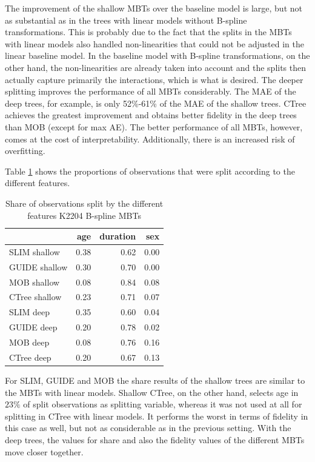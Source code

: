 The improvement of the shallow MBTs over the baseline model is large, but not as substantial as in the trees with linear models without B-spline transformations. This is probably due to the fact that the splits in the MBTs with linear models also handled non-linearities that could not be adjusted in the linear baseline model. In the baseline model with B-spline transformations, on the other hand, the non-linearities are already taken into account and the splits then actually capture primarily the interactions, which is what is desired. 
The deeper splitting improves the performance of all MBTs considerably. The MAE of the deep trees, for example, is only 52\%-61\% of the MAE of the shallow trees. CTree achieves the greatest improvement and obtains better fidelity in the deep trees than MOB (except for max AE). The better performance of all MBTs, however, comes at the cost of interpretability. Additionally, there is an increased risk of overfitting.


Table \ref{tab:ins_k2204_bsplines_surrogates_share}  shows the proportions of observations that were split according to the different features. 


\begin{table}[!htb]
\centering \scriptsize
\begin{tabular}[t]{l|r|r|r}
\hline
  & age & duration & sex\\
\hline
SLIM shallow & 0.38 & 0.62 & 0.00\\
GUIDE shallow & 0.30 & 0.70 & 0.00\\
MOB shallow & 0.08 & 0.84 & 0.08\\
CTree shallow & 0.23 & 0.71 & 0.07\\
\hline
SLIM deep & 0.35 & 0.60 & 0.04\\
GUIDE deep & 0.20 & 0.78 & 0.02\\
MOB deep & 0.08 & 0.76 & 0.16\\
CTree deep & 0.20 & 0.67 & 0.13\\
\hline
\end{tabular}
\caption{Share of observations split by the different features K2204 B-spline MBTs}
\label{tab:ins_k2204_bsplines_surrogates_share}
\end{table}

For SLIM, GUIDE and MOB the share results of the shallow trees are similar to the MBTs with linear models. Shallow CTree, on the other hand, selects age in $23\%$ of split observations as splitting variable, whereas it was not used at all for splitting in CTree with linear models. It performs the worst in terms of fidelity in this case as well, but not as considerable as in the previous setting.
With the deep trees, the values for share and also the fidelity values of the different MBTs move closer together.



